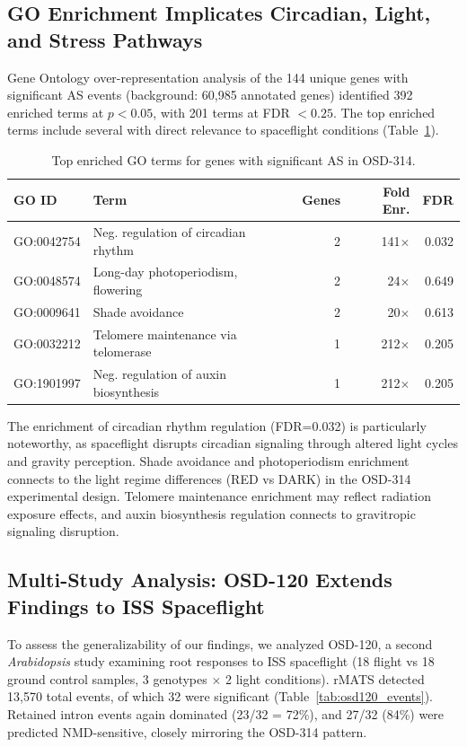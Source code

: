 \documentclass[12pt,a4paper]{article}
\begin{document}
\subsection{GO Enrichment Implicates Circadian, Light, and Stress Pathways}

Gene Ontology over-representation analysis of the 144 unique genes with significant AS events (background: 60,985 annotated genes) identified 392 enriched terms at $p < 0.05$, with 201 terms at FDR $< 0.25$. The top enriched terms include several with direct relevance to spaceflight conditions (Table~\ref{tab:go_enrichment}).

\begin{table}[h]
\centering
\caption{Top enriched GO terms for genes with significant AS in OSD-314.}
\label{tab:go_enrichment}
\begin{tabular}{llrrr}
\toprule
\textbf{GO ID} & \textbf{Term} & \textbf{Genes} & \textbf{Fold Enr.} & \textbf{FDR} \\
\midrule
GO:0042754 & Neg. regulation of circadian rhythm & 2 & 141$\times$ & 0.032 \\
GO:0048574 & Long-day photoperiodism, flowering & 2 & 24$\times$ & 0.649 \\
GO:0009641 & Shade avoidance & 2 & 20$\times$ & 0.613 \\
GO:0032212 & Telomere maintenance via telomerase & 1 & 212$\times$ & 0.205 \\
GO:1901997 & Neg. regulation of auxin biosynthesis & 1 & 212$\times$ & 0.205 \\
\bottomrule
\end{tabular}
\end{table}

The enrichment of circadian rhythm regulation (FDR=0.032) is particularly noteworthy, as spaceflight disrupts circadian signaling through altered light cycles and gravity perception. Shade avoidance and photoperiodism enrichment connects to the light regime differences (RED vs DARK) in the OSD-314 experimental design. Telomere maintenance enrichment may reflect radiation exposure effects, and auxin biosynthesis regulation connects to gravitropic signaling disruption.

\subsection{Multi-Study Analysis: OSD-120 Extends Findings to ISS Spaceflight}

To assess the generalizability of our findings, we analyzed OSD-120, a second \textit{Arabidopsis} study examining root responses to ISS spaceflight (18 flight vs 18 ground control samples, 3 genotypes $\times$ 2 light conditions). rMATS detected 13,570 total events, of which 32 were significant (Table~\ref{tab:osd120_events}). Retained intron events again dominated (23/32 = 72\%), and 27/32 (84\%) were predicted NMD-sensitive, closely mirroring the OSD-314 pattern.
\end{document}
